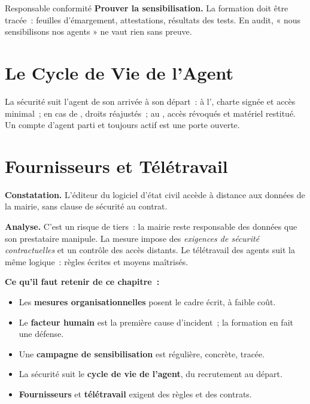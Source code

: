 \begin{boxmetier}{Responsable conformité}
\textbf{Prouver la sensibilisation.} La formation doit être tracée~: feuilles
d'émargement, attestations, résultats des tests. En audit, « nous sensibilisons
nos agents » ne vaut rien sans preuve.
\end{boxmetier}

\section{Le Cycle de Vie de l'Agent}
\label{sec:c15-cyclevie}

La sécurité suit l'agent de son arrivée à son départ~: à l',
charte signée et accès minimal~; en cas de , droits
réajustés~; au , accès révoqués et matériel restitué. Un
compte d'agent parti et toujours actif est une porte ouverte.

\section{Fournisseurs et Télétravail}
\label{sec:c15-tiers}

\begin{boxprocedure}
\textbf{Constatation.} L'éditeur du logiciel d'état civil accède à distance aux
données de la mairie, sans clause de sécurité au contrat.

\medskip
\textbf{Analyse.} C'est un risque de tiers~: la mairie reste responsable des
données que son prestataire manipule. La mesure impose des \emph{exigences de
sécurité contractuelles} et un contrôle des accès distants. Le télétravail des
agents suit la même logique~: règles écrites et moyens maîtrisés.
\end{boxprocedure}

\separateur

\begin{boxresume}
\textbf{Ce qu'il faut retenir de ce chapitre~:}
\begin{itemize}
    \item Les \textbf{mesures organisationnelles} posent le cadre écrit, à
          faible coût.
    \item Le \textbf{facteur humain} est la première cause d'incident~; la
          formation en fait une défense.
    \item Une \textbf{campagne de sensibilisation} est régulière, concrète,
          tracée.
    \item La sécurité suit le \textbf{cycle de vie de l'agent}, du recrutement
          au départ.
    \item \textbf{Fournisseurs} et \textbf{télétravail} exigent des règles et
          des contrats.
\end{itemize}
\end{boxresume}

